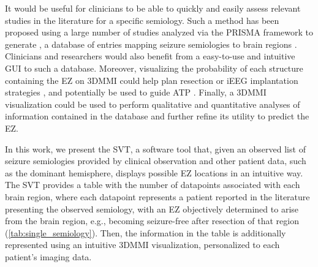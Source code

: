 It would be useful for clinicians to be able to quickly and easily assess relevant studies in the literature for a specific semiology.
Such a method has been proposed using a large number of studies analyzed via the \ac{PRISMA} framework \cite{page_prisma_2021} to generate \svtdatabase, a database of entries mapping seizure semiologies to brain regions \cite{alim-marvasti_probabilistic_2022}.
Clinicians and researchers would also benefit from a easy-to-use and intuitive \ac{GUI} to such a database.
Moreover, visualizing the probability of each structure containing the \ac{EZ} on \ac{3DMMI} could help plan resection or \ac{iEEG} implantation strategies \cite{nowell_utility_2015,nowell_resection_2017}, and potentially be used to guide \ac{ATP} \cite{sparks_automated_2017}.
Finally, a \ac{3DMMI} visualization could be used to perform qualitative and quantitative analyses of information contained in the database and further refine its utility to predict the \ac{EZ}.

In this work, we present the \ac{SVT}, a software tool that, given an observed list of seizure semiologies provided by clinical observation and other patient data, such as the dominant hemisphere, displays possible \ac{EZ} locations in an intuitive way.
The \ac{SVT} provides a table with the number of datapoints associated with each brain region, where each datapoint represents a patient reported in the literature presenting the observed semiology, with an \ac{EZ} objectively determined to arise from the brain region, e.g., becoming seizure-free after resection of that region (\cref{tab:single_semiology}).
Then, the information in the table is additionally represented using an intuitive \ac{3DMMI} visualization, personalized to each patient's imaging data.


